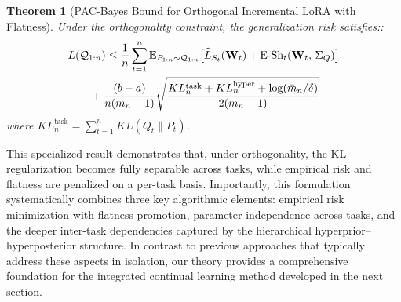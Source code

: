 \documentclass[letterpaper]{article} %
\newtheorem{theorem}{Theorem}
\begin{document}
\begin{theorem}[PAC-Bayes Bound for Orthogonal Incremental LoRA with Flatness]
Under the orthogonality constraint, the generalization risk satisfies::
\begin{align}
      &  L(\mathcal{Q}_{1:n}) \leq  \frac{1}{n} \sum_{t=1}^{n}
        \mathbb{E}_{P_{1:n} \sim \mathcal{Q}_{1:n}}\big[
            \widehat{L}_{S_t}(\mathbf{W}_{t}) \notag
 + \text{E-Sh}_t(\mathbf{W}_{t} ,\, \Sigma_Q)
        \big] \notag\\
&  \qquad + \frac{(b-a) }{n(\bar{m}_n - 1)}\sqrt{
            \frac{KL_{n}^{\text{task}} + KL_{n}^{\text{hyper}} +\log(\bar{m}_{n}/\delta)}{2(\bar{m}_{n} - 1)}
        }
\end{align}
where $KL^{\text{task}}_n = \sum_{t=1}^n KL(Q_t \| P_t) $.
\end{theorem}

This specialized result demonstrates that, under orthogonality, the KL regularization becomes fully separable across tasks, while empirical risk and flatness are penalized on a per-task basis. Importantly, this formulation systematically combines three key algorithmic elements: empirical risk minimization with flatness promotion, parameter independence across tasks, and the deeper inter-task dependencies captured by the hierarchical hyperprior–hyperposterior structure.  In contrast to previous approaches that typically address these aspects in isolation, our theory provides a comprehensive foundation for the integrated continual learning method developed in the next section.

\end{document}
